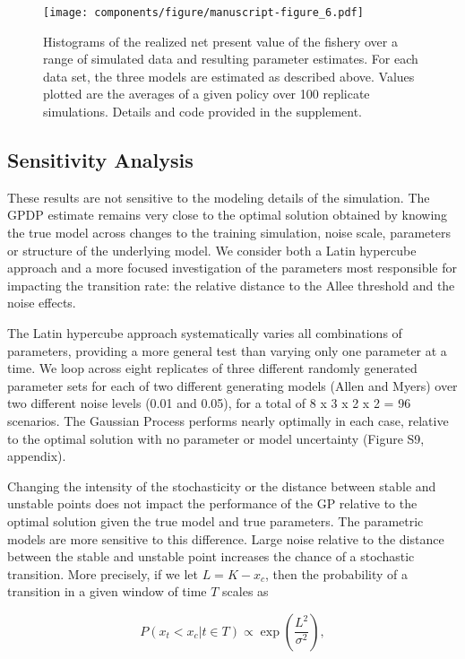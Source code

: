 \documentclass[author-year, 12pt,review]{components/elsarticle} %
\makeatletter
\def\maxwidth{\ifdim\Gin@nat@width>\linewidth\linewidth
\else\Gin@nat@width\fi}
\let\Oldincludegraphics\includegraphics
\renewcommand{\includegraphics}[1]{\Oldincludegraphics[width=\maxwidth]{#1}}
\makeatother
\begin{document}
\begin{figure}[htbp]
\centering
\texttt{[image: components/figure/manuscript-figure\_6.pdf]}
\caption{Histograms of the realized net present value of the fishery
over a range of simulated data and resulting parameter estimates. For
each data set, the three models are estimated as described above. Values
plotted are the averages of a given policy over 100 replicate
simulations. Details and code provided in the supplement.}
\end{figure}

\subsection{Sensitivity Analysis}\label{sensitivity-analysis}

These results are not sensitive to the modeling details of the
simulation. The GPDP estimate remains very close to the optimal solution
obtained by knowing the true model across changes to the training
simulation, noise scale, parameters or structure of the underlying
model. We consider both a Latin hypercube approach and a more focused
investigation of the parameters most responsible for impacting the
transition rate: the relative distance to the Allee threshold and the
noise effects.

The Latin hypercube approach systematically varies all combinations of
parameters, providing a more general test than varying only one
parameter at a time. We loop across eight replicates of three different
randomly generated parameter sets for each of two different generating
models (Allen and Myers) over two different noise levels (0.01 and
0.05), for a total of 8 x 3 x 2 x 2 = 96 scenarios. The Gaussian Process
performs nearly optimally in each case, relative to the optimal solution
with no parameter or model uncertainty (Figure S9, appendix).

Changing the intensity of the stochasticity or the distance between
stable and unstable points does not impact the performance of the GP
relative to the optimal solution given the true model and true
parameters. The parametric models are more sensitive to this difference.
Large noise relative to the distance between the stable and unstable
point increases the chance of a stochastic transition. More precisely,
if we let $L = K - x_c$, then the probability of a transition in a given
window of time $T$ scales as

\[P(x_t < x_c | t \in T) \propto  \exp\left(\frac{L^2}{\sigma^2}\right),\]
\end{document}
